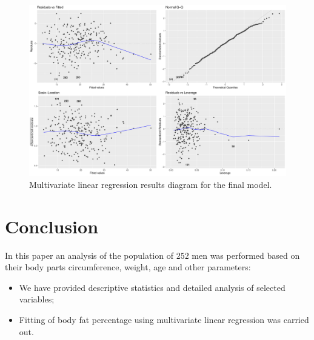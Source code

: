 \documentclass[11pt,american,american]{article}
\begin{document}
\newpage

\begin{figure}[ht!]
	\centering
	\includegraphics[width=0.95\linewidth]{Images/FIGURES/multivar_linear_regression_final}
	\caption{Multivariate linear regression results diagram for the final model.}
	\label{fig:multivar_linear_regression_final}
\end{figure}


\section{Conclusion}

In this paper an analysis of the population of $252$ men was performed based on their body parts circumference, weight, age and other parameters: 

\begin{itemize}
	\item We have provided descriptive statistics and detailed analysis of selected variables;
	\item Fitting of body fat percentage using multivariate linear regression was carried out.
\end{itemize}

%
%
%
%
\end{document}
